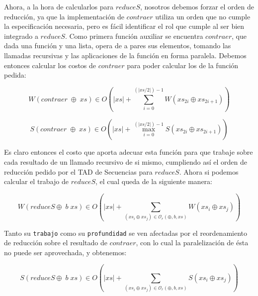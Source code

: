 \documentclass[a4paper,10pt]{article}
\begin{document}
    Ahora, a la hora de calcularlos para $reduceS$, nosotros debemos forzar
el orden de reducción, ya que la implementación de $contraer$ utiliza un orden
que no cumple la especificación necesaria, pero es fácil identificar el rol que
cumple al ser bien integrado a $reduceS$. 
    Como primera función auxiliar se encuentra $contraer$, que dada una función y
una lista, opera de a pares sus elementos, tomando las llamadas recursivas y las 
aplicaciones de la función en forma paralela. Debemos entonces calcular los costos
de $contraer$ para poder calcular los de la función pedida:

\begin{equation*}
    W \left( contraer \;\oplus \;xs \right) \in
    O \left( \vert xs \vert + \sum_{i=0}^{(\vert xs / 2 \vert) - 1} W \left( xs_{2i} \oplus xs_{2i+1} \right) \right)
\end{equation*}

\begin{equation*}
    S \left( contraer \;\oplus \;xs \right) \in
    O \left( \vert xs \vert + \max_{i=0}^{(\vert xs / 2 \vert) - 1} S \left( xs_{2i} \oplus xs_{2i+1} \right) \right)
\end{equation*}

\smallskip

    Es claro entonces el costo que aporta adecuar esta función para que trabaje sobre
cada resultado de un llamado recursivo de si mismo, cumpliendo así el orden de
reducción pedido por el TAD de Secuencias para $reduceS$.
Ahora si podemos calcular el trabajo de $reduceS$, el cual queda de la siguiente
manera: 

\begin{equation*}
    W \left( reduceS \oplus \; b \; xs \right) \in
    O \left( \vert xs \vert + \sum_{(xs_i \oplus xs_j) \in \mathcal{O}_r(\oplus,b,xs)} W \left( xs_i \oplus xs_j \right) \right)
\end{equation*}

\bigskip

    Tanto su \texttt{trabajo} como su \texttt{profundidad} se ven afectadas por
el reordenamiento de reducción sobre el resultado de $contraer$, con lo cual la paralelización
de ésta no puede ser aprovechada, y obtenemos:

\begin{equation*}
    S \left( reduceS \oplus \; b \; xs \right) \in
    O \left( \vert xs \vert + \sum_{(xs_i \oplus xs_j) \in \mathcal{O}_r(\oplus,b,xs)} S \left( xs_i \oplus xs_j \right) \right)
\end{equation*}
\end{document}
